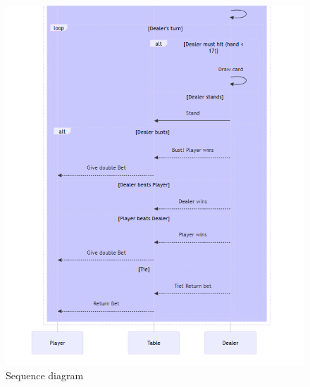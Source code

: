 \begin{figure}[!htb]
    \centering
    \includegraphics[scale=0.55]{report/img/sequenceDiagram2.png}
    \caption{Sequence diagram}
    \label{fig:seqDiagram2}
\end{figure}


